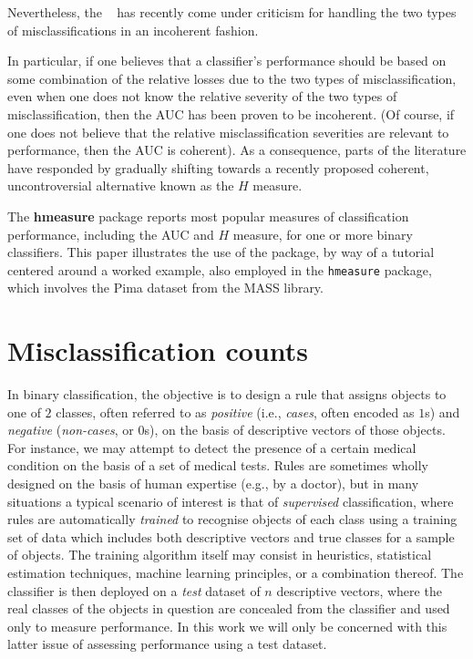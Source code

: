 \documentclass{article}
\def\AUC{\text{AUC}}
\begin{document}
Nevertheless, the \AUC~ has recently come under criticism \cite{hand2009,hand2010a} for handling the two types of misclassifications in an incoherent fashion. 

In particular, if one believes that a classifier's performance should be based on some combination of the relative losses due to the two types of misclassification, even when one does not know the relative severity of the two types of misclassification, then the AUC has been proven to be incoherent. (Of course, if one does not believe that the relative misclassification severities are relevant to performance, then the AUC is coherent). As a consequence, parts of the literature have responded by gradually shifting towards a recently proposed coherent, uncontroversial alternative known as the $H$ measure.

The \textbf{hmeasure} package reports most popular measures of classification performance, including the AUC and $H$ measure, for one or more binary classifiers. This paper illustrates the use of the package, by way of a tutorial centered around a worked example, also employed in the \texttt{hmeasure} package, which involves the Pima dataset from the MASS library. 

\section{Misclassification counts}\label{sec:mis}

In binary classification, the objective is to design a rule that assigns objects to one of $2$ classes, often referred to as \emph{positive} (i.e., \emph{cases}, often encoded as $1$s) and \emph{negative} (\emph{non-cases}, or $0$s), on the basis of descriptive vectors of those objects. For instance, we may attempt to detect the presence of a certain medical condition on the basis of a set of medical tests. Rules are sometimes wholly designed on the basis of human expertise (e.g., by a doctor), but in many situations a typical scenario of interest is that of \emph{supervised} classification, where rules are automatically \emph{trained} to recognise objects of each class using a training set of data which includes both descriptive vectors and true classes for a sample of objects. The training algorithm itself may consist in  heuristics, statistical estimation techniques, machine learning principles, or a combination thereof. The classifier is then deployed on a \emph{test} dataset of $n$ descriptive vectors, where the real classes of the objects in question are concealed from the classifier and used only to measure performance. In this work we will only be concerned with this latter issue of assessing performance using a test dataset.
\end{document}
